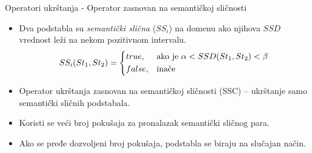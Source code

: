 \documentclass{beamer}
\begin{document}
\begin{frame}{Operatori ukrštanja - Operator zasnovan na semantičkoj sličnosti}
\begin{itemize}
\small
    \item Dva podstabla su \textit{semantički slična} ($SS_i$) na domenu ako njihova $SSD$ vrednost leži na nekom pozitivnom intervalu.
    \scriptsize
    \[
        SS_i(St_1, St_2)= 
    \begin{dcases}
        true,& \text{ako je } \alpha < SSD(St_1, St_2) < \beta\\
        false,              & \text{inače}
    \end{dcases}
    \]
    \small
    \item Operator ukrštanja zasnovan na semantičkoj sličnosti (SSC) -- ukrštanje samo semantički sličnih podstabala.
    \item Koristi se veći broj pokušaja za pronalazak semantički sličnog para.
    \item Ako se pređe dozvoljeni broj pokušaja, podstabla se biraju na slučajan način.
\end{itemize}
\end{frame}
\end{document}
